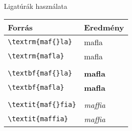 \documentclass[a4paper,10pt]{article}
\begin{document}
  Ligatúrák használata
  
\begin{tabular}{ll}
 	Forrás& Eredmény\\
\toprule
\verb|\textrm{maf{}la}| & \textrm{maf{}la}\\
\verb|\textrm{mafla}|&   \textrm{mafla}	\\  
\midrule\\
\verb|\textbf{maf{}la}| & \textbf{maf{}la}\\
\verb|\textbf{mafla}|&   \textbf{mafla}	\\  
\midrule\\
\verb|\textit{maf{}fia}| & \textit{maf{}fia}\\
\verb|\textit{maffia}|&   \textit{maffia}	\\
\bottomrule
\end{tabular}
\end{document}
